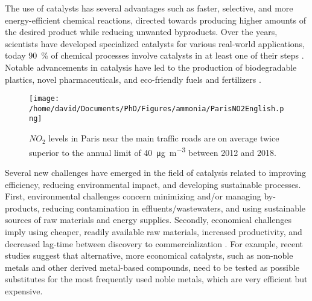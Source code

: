 The use of catalysts has several advantages such as faster, selective, and more energy-efficient chemical reactions, directed towards producing higher amounts of the desired product while reducing unwanted byproducts.
Over the years, scientists have developed specialized catalysts for various real-world applications, today \qty{90}{\percent} of chemical processes involve catalysts in at least one of their steps \parencite{WEINER1998915, DeVries2012}.
Notable advancements in catalysis have led to the production of biodegradable plastics, novel pharmaceuticals, and eco-friendly fuels and fertilizers \parencite{FECHETE20122}.

\begin{figure}[!htb]
    \centering
    \texttt{[image: /home/david/Documents/PhD/Figures/ammonia/ParisNO2English.png]}
    \caption{
        $NO_2$ levels in Paris near the main traffic roads are on average twice superior to the annual limit of \qty{40}{\ug \per \m^3} \parencite{AirParis} between 2012 and 2018.
    }
    \label{fig:NO2Paris}
\end{figure}

Several new challenges have emerged in the field of catalysis related to improving efficiency, reducing environmental impact, and developing sustainable processes.
First, environmental challenges concern minimizing and/or managing by-products, reducing contamination in effluents/wastewaters, and using sustainable sources of raw materials \parencite{LUDWIG2017, Lange2021} and energy supplies.
Secondly, economical challenges imply using cheaper, readily available raw materials, increased productivity, and decreased lag-time between discovery to commercialization \parencite{Keisuke2019, Gunay2021}.
For example, recent studies suggest that alternative, more economical catalysts, such as non-noble metals \parencite{Zhong2021} and other derived metal-based compounds, need to be tested as possible substitutes for the most frequently used noble metals, which are very efficient but expensive.

